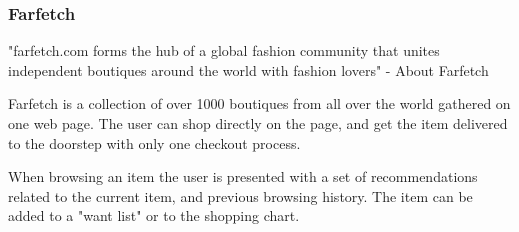 \subsubsection{Farfetch} %
\label{par:farfetch}

"farfetch.com forms the hub of a global fashion community that unites
independent boutiques around the world with fashion lovers" - About
Farfetch~\cite{Farfetch}

Farfetch is a collection of over 1000 boutiques from all over the world
gathered on one web page.  The user can shop directly on the page, and get the
item delivered to the doorstep with only one checkout process.

When browsing an item the user is presented with a set of recommendations
related to the current item, and previous browsing history.  The item can be
added to a "want list" or to the shopping chart.

